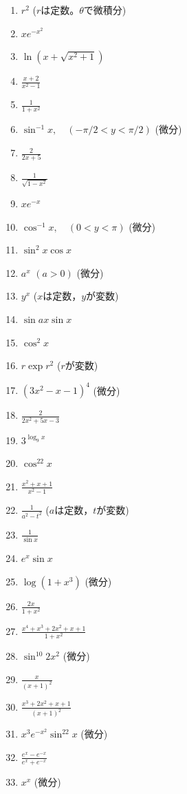 \documentclass[twocolumn,11pt]{jarticle}
\begin{document}
{\begin{enumerate}
\item $r^2$ ($r$は定数。$\theta$で微積分)
\item \label{ditemapp:xe-x2}$xe^{-x^2}$
\item \label{ditemapp:ln(x+sqrt(x2+1))}$\ln(x+\sqrt{x^2+1})$
\item $\displaystyle\frac{x+2}{x^2-1}$
\item \label{itemapp:1/1+x2}$\displaystyle \frac{1}{1+x^2}$
\item \label{ditemapp:sin-1x}$\displaystyle \sin^{-1}x,\quad(-\pi/2<y<\pi/2)$ (微分)
\item \label{ditemapp:1/x}$\displaystyle\frac{2}{2x+5}$
\item \label{itemapp:1/sqrt(1-x2)}$\displaystyle \frac{1}{\sqrt{1-x^2}}$
\item \label{itemapp:xe-x}$\displaystyle xe^{-x} $
\item \label{ditemapp:cos-1x}$\displaystyle \cos^{-1}x,\quad(0<y<\pi)$ (微分)
\item \label{itemapp:sin2xcosx}$\displaystyle\sin^2x\cos x$
\item \label{ditemapp:ax}$a^x$ $(a>0)$ (微分)
\item $y^x$ ($x$は定数，$y$が変数)
\item \label{itemapp:sinaxsinx}$\displaystyle\sin ax\sin x$
\item $\cos^2 x$
\item $r\exp r^2$ ($r$が変数)
\item \label{ditemapp:3x2-x-1}$(3x^2-x-1)^4$ (微分)
\item $\displaystyle\frac{2}{2x^2+5x-3}$
\item $3^{\log_9x}$
\item \label{itemapp:cos22x}$\displaystyle \cos^22x$
\item $\displaystyle\frac{x^2+x+1}{x^2-1}$
\item \label{itemapp:1/(a2-t2)}$\displaystyle \frac{1}{a^2-t^2}$
  ($a$は定数，$t$が変数)
\item \label{itemapp:1/sinx}$\displaystyle \frac{1}{\sin x}$
\item \label{itemapp:e2sinx}$\displaystyle e^x\sin x $
\item \label{itemapp:log(1+x3)}$\displaystyle \log(1+x^3)$ (微分)
\item \label{itemapp:x/1+x2}$\displaystyle \frac{2x}{1+x^2}$
\item \label{itemapp:f(x)/1+x2}$\displaystyle \frac{x^4+x^3+2x^2+x+1}{1+x^2}$
\item \label{ditemapp:sin102x2}$\sin^{10}2x^2$ (微分)
\item \label{itemapp:x/(x+1)^2}$\displaystyle\frac{x}{(x+1)^2}$
\item \label{itemapp:x3+2x2+x+1/(x+1)^2}
  $\displaystyle\frac{x^3+2x^2+x+1}{(x+1)^2}$
\item \label{itemapp:x3e-x2sin22x}$\displaystyle x^3e^{-x^2}\sin^22x$ (微分)
\item \label{itemapp:tanhx}$\displaystyle \frac{e^x-e^{-x}}{e^x+e^{-x}}$
\item \label{itemapp:x^x}$x^x$ (微分)
\end{enumerate}
}
\end{document}
